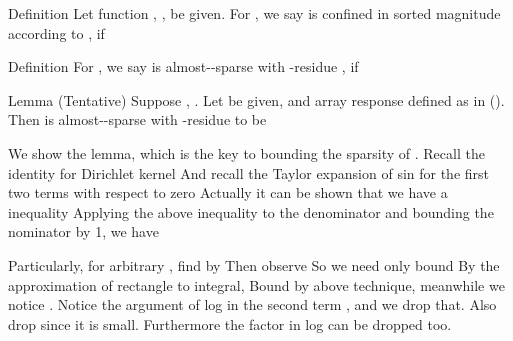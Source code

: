 \Result
{Definition}
{
Let function , , be given.
For , we say  is confined in sorted magnitude according to , if
}

\Result
{Definition}
{
For , we say  is almost--sparse with -residue , if
}

\Result
{Lemma (Tentative)}
{
Suppose , .
Let \m {\f} be given, and array response  defined as in ().
Then  is almost--sparse with -residue  to be
}

We show the lemma, which is the key to bounding the sparsity of .
Recall the identity for Dirichlet kernel
And recall the Taylor expansion of sin for the first two terms with respect to zero
Actually it can be shown that we have a inequality
Applying the above inequality to the denominator and bounding the nominator by 1, we have

Particularly, for arbitrary \m {\f}, find  by
Then observe
So we need only bound
By the approximation of rectangle to integral,
Bound  by above technique, meanwhile we notice .
Notice the argument of log in the second term , and we drop that.
Also drop  since it is small.
Furthermore the \m {2\pi} factor in log can be dropped too.

